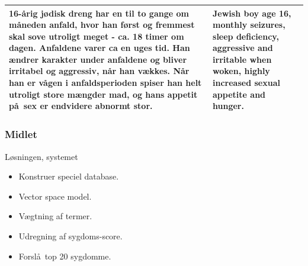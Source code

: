 \documentclass[xcolor=table]{beamer}
\begin{document}
\begin{frame}
\begin{scriptsize}
{\begin{tabular}{| p{5cm} | p{5cm} |}
          16-\aa rig j\o disk dreng har en til to gange om m\aa neden anfald,
          hvor han f\o rst og fremmest skal sove utroligt meget - ca. 18
          timer om dagen. Anfaldene varer ca en uges tid. Han \ae ndrer
          karakter under anfaldene og bliver irritabel og aggressiv, n\aa r
          han v\ae kkes. N\aa r han er v\aa gen i anfaldsperioden spiser han
          helt utroligt store m\ae ngder mad, og hans appetit p\aa\ sex er
          endvidere abnormt stor. & \textbf{Jewish} boy age 16, monthly \textbf{seizures},
          \textbf{sleep deficiency}, \textbf{aggressive} and \textbf{irritable} when woken, highly
          \textbf{increased sexual appetite} and \textbf{hunger}.\\
          
          \hline
          
        \end{tabular}
        
      }

  \end{scriptsize}

  \hspace*{4mm}


  \hspace*{4mm}


\end{frame}

\begin{frame}

  \frametitle{Midlet}

  \begin{block}{L\o sningen, systemet}

    \begin{itemize}

      \item Konstruer speciel database.
      \item Vector space model.
      \item V\ae gtning af termer.
      \item Udregning af sygdoms-score.
      \item Forsl\aa\ top 20 sygdomme.

    \end{itemize}

  \end{block}

\end{frame}
\end{document}
